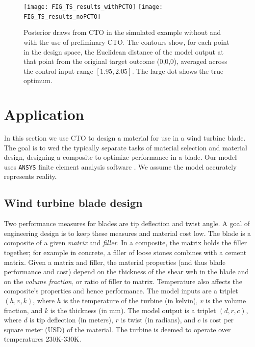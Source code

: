 \documentclass[12pt]{article}
\begin{document}
%
\begin{figure}
\centering
\texttt{[image: FIG\_TS\_results\_withPCTO]}
\hfill
\texttt{[image: FIG\_TS\_results\_noPCTO]}
\caption{Posterior draws from CTO in the simulated example without and with the use of preliminary CTO. The contours show, for each point in the design space, the Euclidean distance of the model output at that point from the original target outcome (0,0,0), averaged across the control input range $[1.95,2.05]$. The large dot shows the true optimum.}
\label{fig:toy_sim_results}
\end{figure}



\section{Application}\label{application}

In this section we use CTO to design a material for use in a wind turbine blade. %
%
The goal is to wed the typically separate tasks of material selection and material design, designing a composite to optimize performance in a blade.
%
Our model uses \texttt{ANSYS} finite element analysis software \citep{ansys}. 
We assume the model accurately represents reality.

\subsection{Wind turbine blade design}

Two performance measures for blades are tip deflection and twist angle.
%
A goal of engineering design is to keep these measures and material cost low.
%
The blade is a composite of a given \emph{matrix} and \emph{filler}. 
%
In a composite, the matrix holds the filler together; for example in concrete, a filler of loose stones combines with a cement matrix.
%
Given a matrix and filler, the material properties (and thus blade performance and cost) depend on the thickness of the shear web in the blade and on the \emph{volume fraction}, or ratio of filler to matrix.
%
%
Temperature also affects the composite's properties and hence performance.
%
The model inputs are a triplet $(h,v,k)$, where $h$ is the temperature of the turbine (in kelvin), $v$ is the volume fraction, and $k$ is the thickness (in mm). 
%
The model output is a triplet $(d,r,c)$, where $d$ is tip deflection (in meters), $r$ is twist (in radians), and $c$ is cost per square meter (USD) of the material.
%
The turbine is deemed to operate over temperatures 230K-330K. 
%
\end{document}
